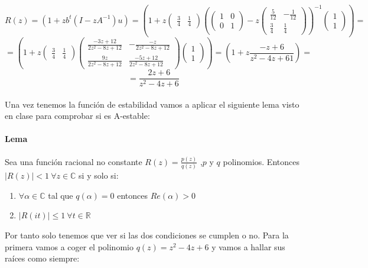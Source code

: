 \documentclass[a4paper,11pt,spanish,leqno]{article}
\begin{document}
\[ R(z) = (1 + zb^t(I-zA^{-1})u) = 
(1 + z
\begin{pmatrix}
	\frac{3}{4} & \frac{1}{4}
\end{pmatrix}
\left(
\begin{pmatrix}
	1 & 0 \\
	0 & 1
\end{pmatrix} 
-z
\begin{pmatrix}
	\frac{5}{12} & -\frac{1}{12} \\
	\frac{3}{4} & \frac{1}{4}
\end{pmatrix}
\right)^{-1}
\begin{pmatrix}
	1 \\
	1
\end{pmatrix} 
)=\]
\[
=(1 + z
\begin{pmatrix}
	\frac{3}{4} & \frac{1}{4}
\end{pmatrix}
\begin{pmatrix}
	\frac{-3z+12}{2z^2 -8z + 12} & -\frac{-z}{2z^2 -8z + 12} \\
	\frac{9z}{2z^2 -8z + 12} & \frac{-5z + 12}{2z^2 -8z + 12}
\end{pmatrix}
\begin{pmatrix}
	1 \\
	1
\end{pmatrix} 
)= (1 + z\frac{-z+6}{z^2-4z+61}) = \]
\[  = \frac{2z+6}{z^2-4z+6}\]

\paragraph{}Una vez tenemos la función de estabilidad vamos a aplicar el siguiente lema visto en clase para comprobar si es A-estable:
\paragraph{Lema} Sea una función racional no constante $R(z) = \frac{p(z)}{q(z)}$ ,$p$ y $q$ polinomios. Entonces $|R(z)| < 1 \ \forall z \in \mathbb{C}$ si y solo si:
\begin{enumerate}
	\item $\forall \alpha \in \mathbb{C}$ tal que $q(\alpha) = 0$ entonces $Re(\alpha) > 0$
	\item $|R(it)| \leq 1 \ \forall t \in \mathbb{R}$
\end{enumerate}

Por tanto solo tenemos que ver si las dos condiciones se cumplen o no. Para la primera vamos a coger el polinomio $q(z) = z^2-4z+6$ y vamos a hallar sus raíces como siempre: 
\end{document}
